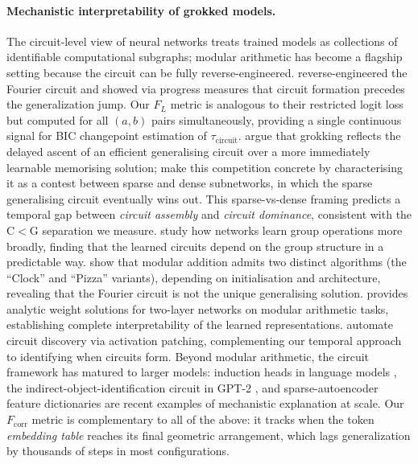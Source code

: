 \documentclass{article}
\newcommand{\taucirc}{\tau_{\mathrm{circuit}}}
\newcommand{\fcorr}{F_{\mathrm{corr}}}
\newcommand{\flogit}{F_{L}}
\begin{document}
\paragraph{Mechanistic interpretability of grokked models.}
The circuit-level view of neural networks
\citep{olah2020zoom,elhage2021mathematical} treats trained models
as collections of identifiable computational subgraphs;
modular arithmetic has become a flagship setting because the circuit
can be fully reverse-engineered.
\citet{nanda2023progress} reverse-engineered the Fourier circuit
and showed via progress measures that circuit formation precedes
the generalization jump.
Our $\flogit$ metric is analogous to their restricted logit loss
but computed for all $(a,b)$ pairs simultaneously, providing a
single continuous signal for BIC changepoint estimation of
$\taucirc$.
\citet{varma2023explaining} argue that grokking reflects the
delayed ascent of an efficient generalising circuit over a
more immediately learnable memorising solution;
\citet{merrill2023tale} make this competition concrete by
characterising it as a contest between sparse and dense subnetworks,
in which the sparse generalising circuit eventually wins out.
This sparse-vs-dense framing predicts a temporal gap between
\emph{circuit assembly} and \emph{circuit dominance}, consistent
with the C$<$G separation we measure.
\citet{chughtai2023toy} study how networks learn group operations
more broadly, finding that the learned circuits depend on the
group structure in a predictable way.
\citet{zhong2023clock} show that modular addition admits two
distinct algorithms (the ``Clock'' and ``Pizza'' variants),
depending on initialisation and architecture, revealing that
the Fourier circuit is not the unique generalising solution.
\citet{gromov2023grokking} provides analytic weight solutions for
two-layer networks on modular arithmetic tasks, establishing
complete interpretability of the learned representations.
\citet{conmy2023towards} automate circuit discovery via activation
patching, complementing our temporal approach to identifying when
circuits form.
Beyond modular arithmetic, the circuit framework has matured to
larger models: induction heads in language models
\citep{olsson2022context}, the indirect-object-identification
circuit in GPT-2 \citep{wang2023interpretability}, and
sparse-autoencoder feature dictionaries
\citep{bricken2023monosemanticity,huben2024sparse} are recent
examples of mechanistic explanation at scale.
Our $\fcorr$ metric is complementary to all of the above: it
tracks when the token \emph{embedding table} reaches its final
geometric arrangement, which lags generalization by thousands of
steps in most configurations.
\end{document}
